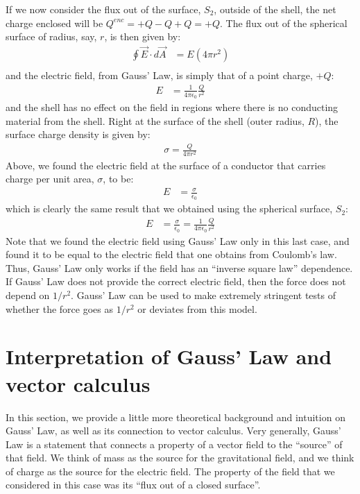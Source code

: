 If we now consider the flux out of the surface, $S_2$, outside of the shell, the net charge enclosed will be $Q^{enc}=+Q-Q+Q=+Q$. The flux out of the spherical surface of radius, say, $r$, is then given by:
\begin{align*}
\oint \vec E\cdot d\vec A &= E(4\pi r^2)\\
\end{align*}
and the electric field, from Gauss' Law, is simply that of a point charge, $+Q$:
\begin{align*}
E&=\frac{1}{4\pi\epsilon_0}\frac{Q}{r^2}
\end{align*}
and the shell has no effect on the field in regions where there is no conducting material from the shell. Right at the surface of the shell (outer radius, $R$), the surface charge density is given by:
\begin{align*}
\sigma=\frac{Q}{4\pi r^2}
\end{align*}
Above, we found the electric field at the surface of a conductor that carries charge per unit area, $\sigma$, to be:
\begin{align*}
E&= \frac{\sigma}{\epsilon_0}
\end{align*}
which is clearly the same result that we obtained using the spherical surface, $S_2$:
\begin{align*}
E&= \frac{\sigma}{\epsilon_0}=\frac{1}{4\pi\epsilon_0}\frac{Q}{r^2}
\end{align*}
Note that we found the electric field using Gauss' Law only in this last case, and found it to be equal to the electric field that one obtains from Coulomb's law. Thus, Gauss' Law only works if the field has an ``inverse square law'' dependence. If Gauss' Law does not provide the correct electric field, then the force does not depend on $1/r^2$. Gauss' Law can be used to make extremely stringent tests of whether the force goes as $1/r^2$ or deviates from this model.

\section{Interpretation of Gauss' Law and vector calculus}
\label{sec:gauss:interpretation}
In this section, we provide a little more theoretical background and intuition on Gauss' Law, as well as its connection to vector calculus. Very generally, Gauss' Law is a statement that connects a property of a vector field to the ``source'' of that field. We think of mass as the source for the gravitational field, and we think of charge as the source for the electric field. The property of the field that we considered in this case was its ``flux out of a closed surface''.

